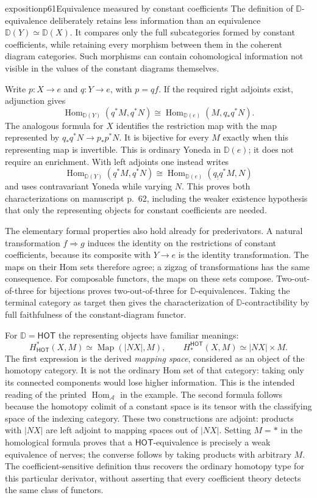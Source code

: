\begin{dcomment}{exposition}{p61}{Equivalence measured by constant coefficients}
The definition of $\mathbb D$-equivalence deliberately retains less information than an equivalence $\mathbb D(Y)\simeq\mathbb D(X)$. It compares only the full subcategories formed by constant coefficients, while retaining every morphism between them in the coherent diagram categories. Such morphisms can contain cohomological information not visible in the values of the constant diagrams themselves.

Write $p:X\to e$ and $q:Y\to e$, with $p=qf$. If the required right adjoints exist, adjunction gives
\[
 \operatorname{Hom}_{\mathbb D(Y)}(q^*M,q^*N)
 \cong\operatorname{Hom}_{\mathbb D(e)}(M,q_*q^*N).
\]
The analogous formula for $X$ identifies the restriction map with the map represented by $q_*q^*N\to p_*p^*N$. It is bijective for every $M$ exactly when this representing map is invertible. This is ordinary Yoneda in $\mathbb D(e)$; it does not require an enrichment. With left adjoints one instead writes
\[
 \operatorname{Hom}_{\mathbb D(Y)}(q^*M,q^*N)
 \cong\operatorname{Hom}_{\mathbb D(e)}(q_!q^*M,N)
\]
and uses contravariant Yoneda while varying $N$. This proves both characterizations on manuscript p.~62, including the weaker existence hypothesis that only the representing objects for constant coefficients are needed.

The elementary formal properties also hold already for prederivators. A natural transformation $f\Rightarrow g$ induces the identity on the restrictions of constant coefficients, because its composite with $Y\to e$ is the identity transformation. The maps on their Hom sets therefore agree; a zigzag of transformations has the same consequence. For composable functors, the maps on these sets compose. Two-out-of-three for bijections proves two-out-of-three for $\mathbb D$-equivalences. Taking the terminal category as target then gives the characterization of $\mathbb D$-contractibility by full faithfulness of the constant-diagram functor.

For $\mathbb D=\mathsf{HOT}$ the representing objects have familiar meanings:
\[
 H^*_{\mathsf{HOT}}(X,M)\simeq
 \operatorname{Map}(|NX|,M),
 \qquad
 H_*^{\mathsf{HOT}}(X,M)\simeq |NX|\times M.
\]
The first expression is the derived \emph{mapping space}, considered as an object of the homotopy category. It is not the ordinary Hom set of that category: taking only its connected components would lose higher information. This is the intended reading of the printed $\operatorname{Hom}_{\mathcal A}$ in the example. The second formula follows because the homotopy colimit of a constant space is its tensor with the classifying space of the indexing category. These two constructions are adjoint: products with $|NX|$ are left adjoint to mapping spaces out of $|NX|$. Setting $M=*$ in the homological formula proves that a $\mathsf{HOT}$-equivalence is precisely a weak equivalence of nerves; the converse follows by taking products with arbitrary $M$. The coefficient-sensitive definition thus recovers the ordinary homotopy type for this particular derivator, without asserting that every coefficient theory detects the same class of functors.


\end{dcomment}
